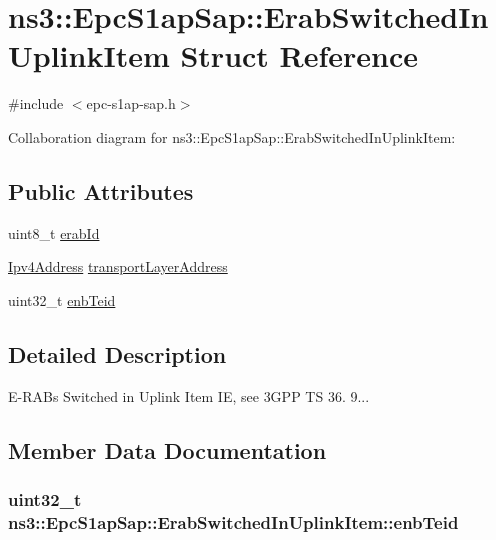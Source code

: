 \hypertarget{structns3_1_1EpcS1apSap_1_1ErabSwitchedInUplinkItem}{}\section{ns3\+:\+:Epc\+S1ap\+Sap\+:\+:Erab\+Switched\+In\+Uplink\+Item Struct Reference}
\label{structns3_1_1EpcS1apSap_1_1ErabSwitchedInUplinkItem}


{\ttfamily \#include $<$epc-\/s1ap-\/sap.\+h$>$}



Collaboration diagram for ns3\+:\+:Epc\+S1ap\+Sap\+:\+:Erab\+Switched\+In\+Uplink\+Item\+:
\subsection*{Public Attributes}
\begin{DoxyCompactItemize}
\item 
uint8\+\_\+t \hyperlink{structns3_1_1EpcS1apSap_1_1ErabSwitchedInUplinkItem_a3a59a2c6404e966375c3523c85cbf744}{erab\+Id}
\item 
\hyperlink{classns3_1_1Ipv4Address}{Ipv4\+Address} \hyperlink{structns3_1_1EpcS1apSap_1_1ErabSwitchedInUplinkItem_aee52f31baf83ab9dbd29c0e945908cc3}{transport\+Layer\+Address}
\item 
uint32\+\_\+t \hyperlink{structns3_1_1EpcS1apSap_1_1ErabSwitchedInUplinkItem_aa390988eed2351e598764254db9280b9}{enb\+Teid}
\end{DoxyCompactItemize}


\subsection{Detailed Description}
E-\/\+R\+A\+Bs Switched in Uplink Item IE, see 3\+G\+PP TS 36. 9... 

\subsection{Member Data Documentation}
\subsubsection[{\texorpdfstring{enb\+Teid}{enbTeid}}]{\setlength{\rightskip}{0pt plus 5cm}uint32\+\_\+t ns3\+::\+Epc\+S1ap\+Sap\+::\+Erab\+Switched\+In\+Uplink\+Item\+::enb\+Teid}\hypertarget{structns3_1_1EpcS1apSap_1_1ErabSwitchedInUplinkItem_aa390988eed2351e598764254db9280b9}{}\label{structns3_1_1EpcS1apSap_1_1ErabSwitchedInUplinkItem_aa390988eed2351e598764254db9280b9}
